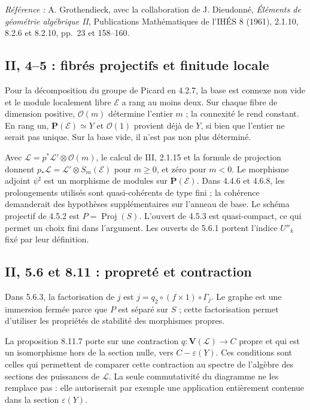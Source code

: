 \documentclass[11pt,a4paper]{article}
\begin{document}
\noindent\emph{Référence :} A. Grothendieck, avec la collaboration
de J. Dieudonné, \emph{Éléments de géométrie algébrique II},
Publications Mathématiques de l'IHÉS 8 (1961), 2.1.10,
8.2.6 et 8.2.10, pp.~23 et 158--160.


\subsection{II, 4--5 : fibrés projectifs et finitude locale}
\label{note:base2-projective}
Pour la décomposition du groupe de Picard en 4.2.7, la base est
connexe non vide et le module localement libre $\mathcal E$ a
rang au moins deux. Sur chaque fibre de dimension positive,
$\mathcal O(m)$ détermine l'entier $m$ ; la connexité le rend
constant. En rang un, $\mathbf P(\mathcal E)\simeq Y$ et
$\mathcal O(1)$ provient déjà de $Y$, si bien que l'entier ne serait
pas unique. Sur la base vide, il n'est pas non plus déterminé.

Avec $\mathcal L=p^*\mathcal L'\otimes\mathcal O(m)$,
le calcul de III, 2.1.15 et la formule de projection donnent
$p_*\mathcal L=\mathcal L'\otimes S_m(\mathcal E)$ pour $m\geq0$,
et zéro pour $m<0$. Le morphisme adjoint $\psi^\sharp$ est un
morphisme de modules sur $\mathbf P(\mathcal E)$.
Dans 4.4.6 et 4.6.8, les prolongements utilisés sont
quasi-cohérents de type fini ; la cohérence demanderait des
hypothèses supplémentaires sur l'anneau de base.
Le schéma projectif de 4.5.2 est $P=\operatorname{Proj}(S)$.
L'ouvert de 4.5.3 est quasi-compact, ce qui permet un choix fini
dans l'argument. Les ouverts de 5.6.1 portent l'indice $U''_k$
fixé par leur définition.

\subsection{II, 5.6 et 8.11 : propreté et contraction}
\label{note:base2-proper}
Dans 5.6.3, la factorisation de $j$ est
$j=q_2\circ(f\times1)\circ\Gamma_j$.
Le graphe est une immersion fermée parce que $P$ est séparé sur
$S$ ; cette factorisation permet d'utiliser les propriétés de
stabilité des morphismes propres.

La proposition 8.11.7 porte sur une contraction
$q:\mathbf V(\mathcal L)\to C$ propre et qui est un isomorphisme
hors de la section nulle, vers $C-\varepsilon(Y)$.
Ces conditions sont celles qui permettent de comparer cette
contraction au spectre de l'algèbre des sections des puissances
de $\mathcal L$. La seule commutativité du diagramme ne les
remplace pas : elle autoriserait par exemple une application
entièrement contenue dans la section $\varepsilon(Y)$.
\end{document}
